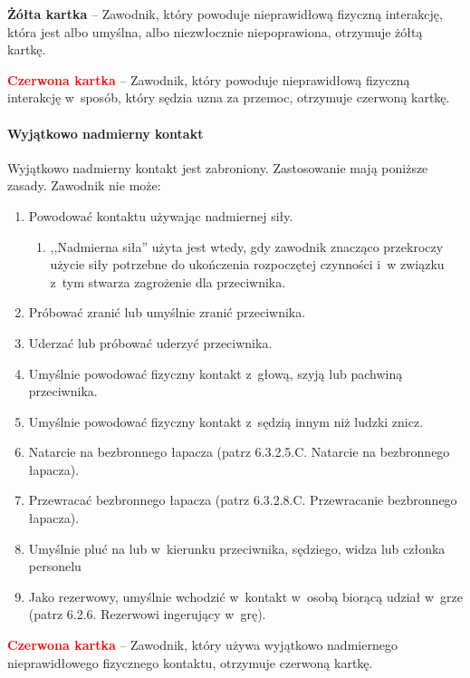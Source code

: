 \documentclass[12pt,a4paper]{article}
\newcommand\redcard[1]{\bgroup\textcolor{red}{\textbf{#1}}}
\newcommand\yellowcard[1]{\bgroup\textcolor{darkyellow}{\textbf{#1}}}
\begin{document}
\yellowcard{Żółta kartka} -- Zawodnik, który powoduje nieprawidłową fizyczną
interakcję, która jest albo umyślna, albo niezwłocznie niepoprawiona,
otrzymuje żółtą kartkę.

\redcard{Czerwona kartka} -- Zawodnik, który powoduje nieprawidłową fizyczną
interakcję w~sposób, który sędzia uzna za przemoc, otrzymuje czerwoną
kartkę.

\paragraph{Wyjątkowo nadmierny kontakt}
Wyjątkowo nadmierny
kontakt jest zabroniony. Zastosowanie mają poniższe zasady. Zawodnik nie
może:

\begin{enumerate}
	\item
	      Powodować kontaktu używając nadmiernej siły.

	      \begin{enumerate}
		      \item
		            ,,Nadmierna siła'' użyta jest wtedy, gdy zawodnik znacząco
		            przekroczy użycie siły potrzebne do ukończenia rozpoczętej czynności
		            i~w związku z~tym stwarza zagrożenie dla przeciwnika.
	      \end{enumerate}
	\item
	      Próbować zranić lub umyślnie zranić przeciwnika.
	\item
	      Uderzać lub próbować uderzyć przeciwnika.
	\item
	      Umyślnie powodować fizyczny kontakt z~głową, szyją lub pachwiną
	      przeciwnika.
	\item
	      Umyślnie powodować fizyczny kontakt z~sędzią innym niż ludzki znicz.
	\item
	      Natarcie na bezbronnego łapacza (patrz 6.3.2.5.C. Natarcie na
	      bezbronnego łapacza).
	\item
	      Przewracać bezbronnego łapacza (patrz 6.3.2.8.C. Przewracanie
	      bezbronnego łapacza).
	\item
	      Umyślnie pluć na lub w~kierunku przeciwnika, sędziego, widza lub
	      członka personelu
	\item
	      Jako rezerwowy, umyślnie wchodzić w~kontakt w~osobą biorącą udział w~grze (patrz 6.2.6. Rezerwowi ingerujący w~grę).
\end{enumerate}

\redcard{Czerwona kartka} -- Zawodnik, który używa wyjątkowo nadmiernego
nieprawidłowego fizycznego kontaktu, otrzymuje czerwoną kartkę.
\end{document}
